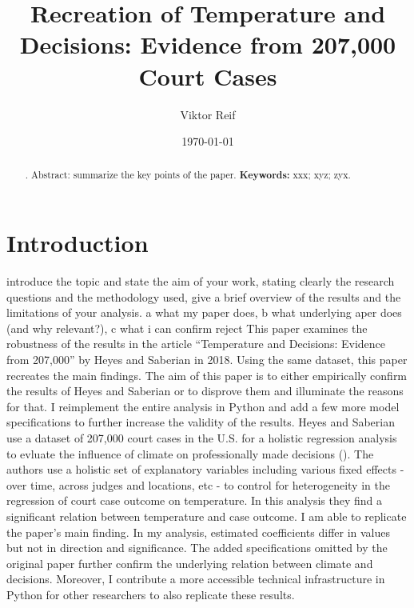 \documentclass[11pt]{article}
\title{Recreation of Temperature and Decisions: Evidence from 207,000
	Court Cases}
\author{Viktor Reif}
\date{\today}
\begin{document}
	\maketitle
	
	
	\begin{abstract}
		\singlespacing
		. Abstract: summarize the key points of the paper.
		\newline \noindent \textbf{Keywords:} xxx; xyz; zyx. 
	\end{abstract}
	
	
	\section{Introduction}
	introduce the topic and state the aim of your work, stating clearly the
	research questions and the methodology used, give a brief overview of the results and the
	limitations of your analysis.
	a what my paper does, b what underlying aper does (and why relevant?), c what i can confirm reject
	\newline This paper examines the robustness of the results in the article “Temperature and Decisions: Evidence from 207,000” by Heyes and Saberian in 2018. Using the same dataset, this paper recreates the main findings. The aim of this paper is to either empirically confirm the results of Heyes and Saberian or to disprove them and illuminate the reasons for that. I reimplement the entire analysis in Python and add a few more model specifications to further increase the validity of the results.
	\newline Heyes and Saberian use a dataset of 207,000 court cases in the U.S. for a holistic regression analysis to evluate the influence of climate on professionally made decisions (\cite{Heyes.2019}). The authors use a holistic set of explanatory variables including various fixed effects - over time, across judges and locations, etc - to control for heterogeneity in the regression of court case outcome on temperature. In this analysis they find a significant relation between temperature and case outcome.
	\newline I am able to replicate the paper’s main finding. In my analysis, estimated coefficients differ in values but not in direction and significance. The added specifications omitted by the original paper further confirm the underlying relation between climate and decisions. Moreover, I contribute a more accessible technical infrastructure in Python for other researchers to also replicate these results.  
\end{document}
